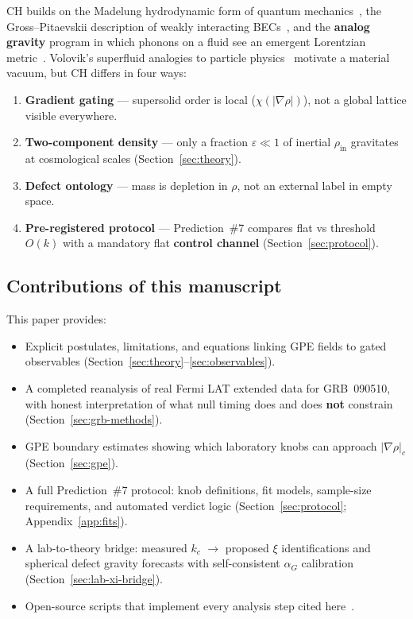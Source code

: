 \documentclass[11pt,a4paper]{article}
\begin{document}
CH builds on the Madelung hydrodynamic form of quantum mechanics~\cite{Madelung1927}, the Gross--Pitaevskii description of weakly interacting BECs~\cite{Gross1961,Pitaevskii1961}, and the \textbf{analog gravity} program in which phonons on a fluid see an emergent Lorentzian metric~\cite{Unruh1981,Visser1995}.
Volovik's superfluid analogies to particle physics~\cite{Volovik2003} motivate a material vacuum, but CH differs in four ways:
\begin{enumerate}[label=(\roman*), leftmargin=*]
  \item \textbf{Gradient gating} --- supersolid order is local ($\chi(|\nabla\rho|)$), not a global lattice visible everywhere.
  \item \textbf{Two-component density} --- only a fraction $\varepsilon \ll 1$ of inertial $\rho_{\mathrm{in}}$ gravitates at cosmological scales (Section~\ref{sec:theory}).
  \item \textbf{Defect ontology} --- mass is depletion in $\rho$, not an external label in empty space.
  \item \textbf{Pre-registered protocol} --- Prediction~\#7 compares flat vs threshold $O(k)$ with a mandatory flat \textbf{control channel} (Section~\ref{sec:protocol}).
\end{enumerate}

\subsection{Contributions of this manuscript}

This paper provides:
\begin{itemize}[leftmargin=*]
  \item Explicit postulates, limitations, and equations linking GPE fields to gated observables (Section~\ref{sec:theory}--\ref{sec:observables}).
  \item A completed reanalysis of real Fermi LAT extended data for GRB~090510, with honest interpretation of what null timing does and does \textbf{not} constrain (Section~\ref{sec:grb-methods}).
  \item GPE boundary estimates showing which laboratory knobs can approach $|\nabla\rho|_c$ (Section~\ref{sec:gpe}).
  \item A full Prediction~\#7 protocol: knob definitions, fit models, sample-size requirements, and automated verdict logic (Section~\ref{sec:protocol}; Appendix~\ref{app:fits}).
  \item A lab-to-theory bridge: measured $k_c$ $\to$ proposed $\xi$ identifications and spherical defect gravity forecasts with self-consistent $\alpha_G$ calibration (Section~\ref{sec:lab-xi-bridge}).
  \item Open-source scripts that implement every analysis step cited here~\cite{CHSpaceFabric2026}.
\end{itemize}
\end{document}
